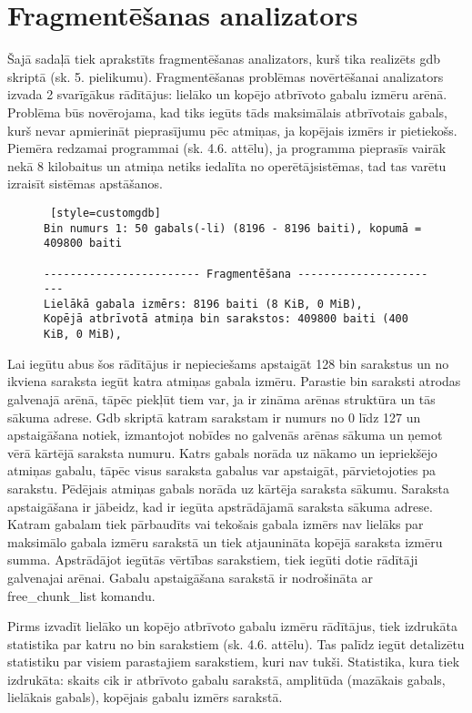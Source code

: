 \section{Fragmentēšanas analizators}
Šajā sadaļā tiek aprakstīts fragmentēšanas analizators, kurš tika realizēts gdb skriptā (sk. 5. pielikumu).
Fragmentēšanas problēmas novērtēšanai analizators izvada 2 svarīgākus rādītājus: lielāko un kopējo atbrīvoto gabalu izmēru arēnā.
Problēma būs novērojama, kad tiks iegūts tāds maksimālais atbrīvotais gabals, kurš nevar apmierināt pieprasījumu pēc atmiņas, ja kopējais izmērs ir pietiekošs.
Piemēra redzamai programmai (sk. 4.6. attēlu), ja programma pieprasīs vairāk nekā 8 kilobaitus un atmiņa netiks iedalīta no operētājsistēmas, tad tas varētu izraisīt sistēmas apstāšanos.
\begin{figure}[h]
\begin{lstlisting} [style=customgdb]
Bin numurs 1: 50 gabals(-li) (8196 - 8196 baiti), kopumā = 409800 baiti

------------------------ Fragmentēšana -----------------------
Lielākā gabala izmērs: 8196 baiti (8 KiB, 0 MiB),
Kopējā atbrīvotā atmiņa bin sarakstos: 409800 baiti (400 KiB, 0 MiB),
\end{lstlisting}
\caption{\textbf{\fontsize{11}{12}\selectfont {Fragmentēšanas rādītāji}}}
\end{figure}

Lai iegūtu abus šos rādītājus ir nepieciešams apstaigāt 128 bin sarakstus un no ikviena saraksta iegūt katra atmiņas gabala izmēru.
Parastie bin saraksti atrodas galvenajā arēnā, tāpēc piekļūt tiem var, ja ir zināma arēnas struktūra un tās sākuma adrese.
Gdb skriptā katram sarakstam ir numurs no 0 līdz 127 un apstaigāšana notiek, izmantojot nobīdes no galvenās arēnas sākuma un ņemot vērā kārtējā saraksta numuru.
Katrs gabals norāda uz nākamo un iepriekšējo atmiņas gabalu, tāpēc visus saraksta gabalus var apstaigāt, pārvietojoties pa sarakstu.
Pēdējais atmiņas gabals norāda uz kārtēja saraksta sākumu.
Saraksta apstaigāšana ir jābeidz, kad ir iegūta apstrādājamā saraksta sākuma adrese.
Katram gabalam tiek pārbaudīts vai tekošais gabala izmērs nav lielāks par maksimālo gabala izmēru sarakstā un tiek atjaunināta kopējā saraksta izmēru summa.
Apstrādājot iegūtās vērtības sarakstiem, tiek iegūti dotie rādītāji galvenajai arēnai.
Gabalu apstaigāšana sarakstā ir nodrošināta ar free\_chunk\_list komandu.

Pirms izvadīt lielāko un kopējo atbrīvoto gabalu izmēru rādītājus, tiek izdrukāta statistika par katru no bin sarakstiem (sk. 4.6. attēlu).
Tas palīdz iegūt detalizētu statistiku par visiem parastajiem sarakstiem, kuri nav tukši.
Statistika, kura tiek izdrukāta: skaits cik ir atbrīvoto gabalu sarakstā, amplitūda (mazākais gabals, lielākais gabals), kopējais gabalu izmērs sarakstā.

